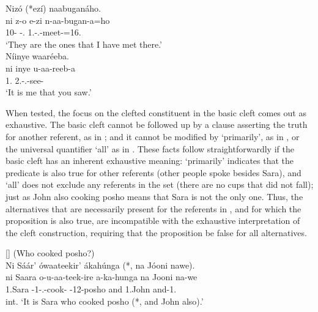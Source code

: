 \documentclass[output=paper]{langscibook}
\begin{document}
\ex
\label{bkm:Ref111469645}
Nizó (*ezí) naabuganáho.\\
\gll
ni  z-o  e-zi  n-aa-bugan-a=ho\\
\COP{}  10-\PRO{}  \AUG{}-\REL{}.\PRO{}  1\SG{}.\SM{}-\N{}.\PST{}-meet-\FV{}=16.\LOC{}\\
\glt
‘They are the ones that I have met there.’\\
\ex
\label{bkm:Ref135725703}
Níinye waaréeba.\\
\gll
ni  inye  u-aa-reeb-a\\
\COP{}  1\SG{}.\PRO{}  2\SG{}.\SM{}-\N{}.\PST{}-see-\FV{}\\
\glt
‘It is me that you saw.’\\
\z

When tested, the focus on the clefted constituent in the basic cleft comes out as exhaustive. The basic cleft cannot be followed up by a clause asserting the truth for another referent, as in ; and it cannot be modified by ‘primarily’, as in , or the universal quantifier ‘all’ as in . These facts follow straightforwardly if the basic cleft has an inherent exhaustive meaning: ‘primarily’ indicates that the predicate is also true for other referents (other people spoke besides Sara), and ‘all’ does not exclude any referents in the set (there are no cups that did not fall); just as John also cooking posho means that Sara is not the only one. Thus, the alternatives that are necessarily present for the referents in , and for which the proposition is also true, are incompatible with the exhaustive interpretation of the cleft construction, requiring that the proposition be false for all alternatives.\largerpage

\ea
[]{
\label{bkm:Ref111494752}\label{bkm:Ref135726191}
(Who cooked posho?)\\
Ni Sáár’ ówaateekir’ ákahúnga (*, na Jóoni nawe).\\
\gll
ni  Saara  o-u-aa-teek-ire  a-ka-hunga  na  Jooni  na-we\\
\COP{}  1.Sara  \AUG{}-1\SM{}-\N{}.\PST{}-cook-\PFV{}  \AUG{}-12-posho  and  1.John  and-1.\PRO{} \\
\glt
int. ‘It is Sara who cooked posho (*, and John also).’\\
}
\end{document}
